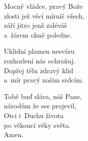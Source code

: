 \begin{translatioMulticol}{3}
Mocný vládce, pravý Bože\\
zlosti jež věcí mírníš všech,\\
září jitro jenž zaléváš\\
a~žárem ohně poledne.\columnbreak

Uklidni plamen nesváru\\
rozhorlení nás ochraňuj.\\
Dopřej tělu zdravý klid\\
a~mír pravý našim srdcím.\columnbreak

Tobě buď sláva, náš Pane,\\
národům že ses projevil,\\
Otci i~Duchu života\\
po věkoucí věky světa.\\
Amen.
\end{translatioMulticol}
